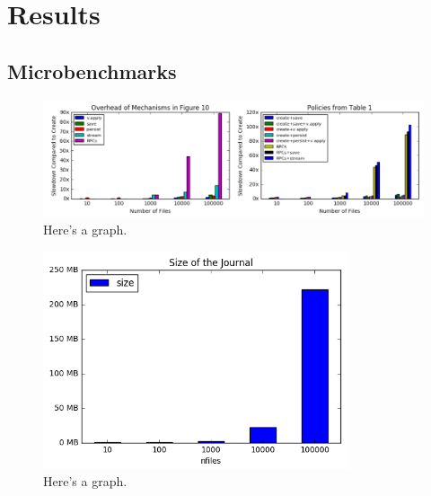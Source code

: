 \section{Results}
\subsection{Microbenchmarks}
\begin{figure}[tb]
\centering
\includegraphics[width=180mm]{figures/results-microbenchmark.png}
\caption{Here's a graph.}
\end{figure}

\begin{figure}[tb]
\centering
\includegraphics[width=90mm]{figures/results-files.png}
\caption{Here's a graph.}
\end{figure}


